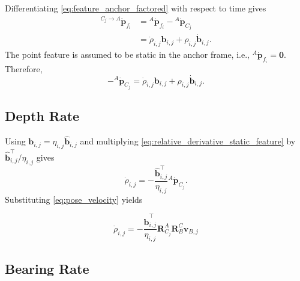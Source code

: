 \documentclass[11pt,a4paper]{article}
\begin{document}
Differentiating \eqref{eq:feature_anchor_factored} with respect to time gives
\begin{align}
  {}^{C_j\to A}\dot{\bm{p}}_{f_i}
  &= {}^{A}\dot{\bm{p}}_{f_i}-{}^{A}\dot{\bm{p}}_{C_j} \\
  &= \dot{\rho}_{i,j}\bm{b}_{i,j}
     + \rho_{i,j}\dot{\bm{b}}_{i,j}. 
  \label{eq:relative_position_derivative}
\end{align}
The point feature is assumed to be static in the anchor frame, i.e.,
${}^{A}\dot{\bm{p}}_{f_i}=\bm{0}$.  Therefore,
\begin{equation}
  -{}^{A}\dot{\bm{p}}_{C_j}
  = \dot{\rho}_{i,j}\bm{b}_{i,j}
    + \rho_{i,j}\dot{\bm{b}}_{i,j}.
  \label{eq:relative_derivative_static_feature}
\end{equation}

\subsection{Depth Rate}

Using $\bm{b}_{i,j}=\eta_{i,j}\hat{\bm{b}}_{i,j}$ and multiplying
\eqref{eq:relative_derivative_static_feature} by
$\hat{\bm{b}}_{i,j}^{\top}/\eta_{i,j}$ gives
\begin{equation}
  \dot{\rho}_{i,j}
  = -\frac{\hat{\bm{b}}_{i,j}^{\top}}{\eta_{i,j}}
  {}^{A}\dot{\bm{p}}_{C_j}.
\end{equation}
Substituting \eqref{eq:pose_velocity} yields
\begin{resultbox}
\begin{equation}
  \boxed{
  \dot{\rho}_{i,j}
  = -\frac{\hat{\bm{b}}_{i,j}^{\top}}{\eta_{i,j}}
  \bm{R}_{C_j}^{A}\bm{R}_{B}^{C}\bm{v}_{B,j}}
  \label{eq:rhodot_multi_feature}
\end{equation}
\end{resultbox}

\subsection{Bearing Rate}
\end{document}
